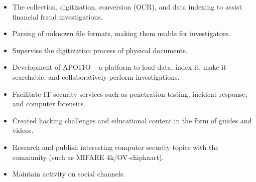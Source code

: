 \documentclass[10pt,a4paper,ragged2e,withhyper]{altacv}
\begin{document}
\begin{paracol}{2}
\newpage

\begin{itemize}
\item The collection, digitization, conversion (OCR), and data indexing to assist financial fraud investigations.
\item Parsing of unknown file formats, making them usable for investigators.
\item Supervise the digitization process of physical documents.
\end{itemize}

\divider
\vspace{0.5em}

\begin{itemize}
\item Development of APO11O -- a platform to load data, index it, make it searchable, and collaboratively perform investigations.
\item Facilitate IT security services such as penetration testing, incident response, and computer forensics.
\end{itemize}

\divider
\vspace{0.5em}

\begin{itemize}
\item Created hacking challenges and educational content in the form of guides and videos.
\item Research and publish interesting computer security topics with the community (such as MIFARE 4k/OV-chipkaart).
\item Maintain activity on social channels.
\end{itemize}

\newpage

\switchcolumn


\\
\\

\divider\smallskip
\vspace{0.5em}


\end{paracol}
\end{document}
